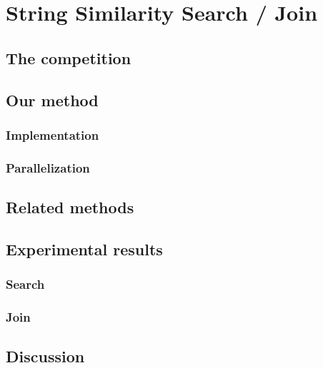 \chapter{String Similarity Search / Join}
\section{The competition}
\section{Our method}
\subsection{Implementation}
\subsection{Parallelization}
\section{Related methods}
\section{Experimental results}
\subsection{Search}
\subsection{Join}
\section{Discussion}
